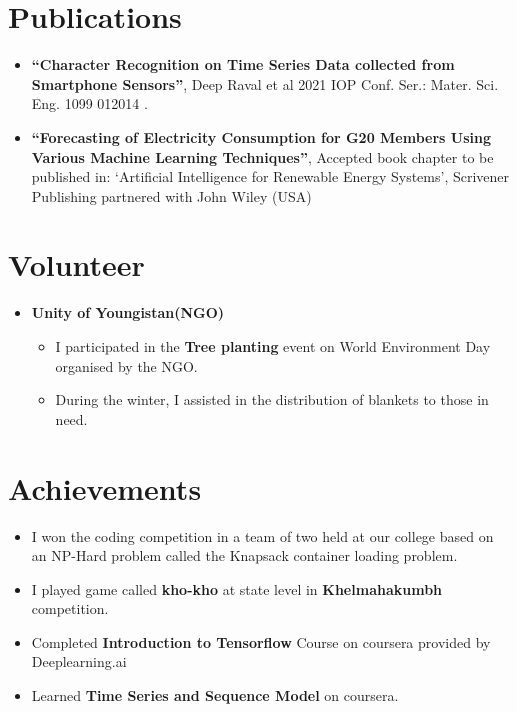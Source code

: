 \documentclass[letterpaper,11pt]{article}
\newcommand{\resumeSubHeadingListStart}{\begin{itemize}[leftmargin=*]}
\newcommand{\resumeSubHeadingListEnd}{\end{itemize}}
\begin{document}
\section{Publications}
\resumeSubHeadingListStart
\item {\bf“Character Recognition on Time Series Data collected from Smartphone Sensors”}, Deep Raval et
al 2021 IOP Conf. Ser.: Mater. Sci. Eng. 1099 012014 .\href{https://iopscience.iop.org/article/10.1088/1757-899X/1099/1/012014}{\faExternalLink}
\item {\bf “Forecasting of Electricity Consumption for G20 Members Using Various Machine Learning
Techniques”}, Accepted book chapter to be published in: ‘Artificial Intelligence for Renewable Energy
Systems’, Scrivener Publishing partnered with John Wiley (USA)
\resumeSubHeadingListEnd
\section{Volunteer}
\resumeSubHeadingListStart
\item {\bf Unity of Youngistan(NGO)} \href{https://instagram.com/youngistan_official?utm_medium=copy_link}{\faExternalLink}
	\begin{itemize}
\item I participated in the {\bf Tree planting} event on World Environment Day organised by the NGO.
\item During the winter, I assisted in the distribution of blankets to those in need.
	\end{itemize}
\resumeSubHeadingListEnd

\section{Achievements}
\resumeSubHeadingListStart
\item I won the coding competition in a team of two held at our college based on an NP-Hard problem called the Knapsack container loading problem.
\item I played game called {\bf kho-kho} at state level in {\bf Khelmahakumbh} competition.
\item Completed {\bf Introduction to Tensorflow} Course on coursera provided by Deeplearning.ai
\item Learned {\bf Time Series and Sequence Model} on coursera.
\resumeSubHeadingListEnd
\end{document}
